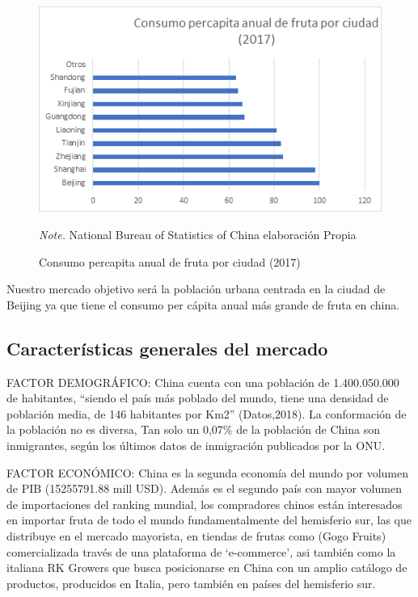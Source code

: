 \documentclass[
  stu,
  floatsintext,
  longtable,
  a4paper,
  nolmodern,
  notxfonts,
  notimes,
  colorlinks=true,linkcolor=blue,citecolor=blue,urlcolor=blue]{apa7}
\begin{document}
\begin{figure}[!htbp]

{\caption{{Consumo percapita anual de fruta por ciudad
(2017)}{\label{fig-myimportedimagecpadfpc}}}}

\includegraphics[width=5in,height=\textheight,keepaspectratio]{index_files/figure-html/figura12.png}

{\noindent \emph{Note.} National Bureau of Statistics of China
elaboración Propia}

\end{figure}

Nuestro mercado objetivo será la población urbana centrada en la ciudad
de Beijing ya que tiene el consumo per cápita anual más grande de fruta
en china.

\subsection{Características generales del
mercado}\label{caracteruxedsticas-generales-del-mercado}

FACTOR DEMOGRÁFICO: China cuenta con una población de 1.400.050.000 de
habitantes, ``siendo el país más poblado del mundo, tiene una densidad
de población media, de 146 habitantes por Km2'' (Datos,2018). La
conformación de la población no es diversa, Tan solo un 0,07\% de la
población de China son inmigrantes, según los últimos datos de
inmigración publicados por la ONU.

FACTOR ECONÓMICO: China es la segunda economía del mundo por volumen de
PIB (15255791.88 mill USD). Además es el segundo país con mayor volumen
de importaciones del ranking mundial, los compradores chinos están
interesados en importar fruta de todo el mundo fundamentalmente del
hemisferio sur, las que distribuye en el mercado mayorista, en tiendas
de frutas como (Gogo Fruits) comercializada través de una plataforma de
`e-commerce', asi también como la italiana RK Growers que busca
posicionarse en China con un amplio catálogo de productos, producidos en
Italia, pero también en países del hemisferio sur.
\end{document}
